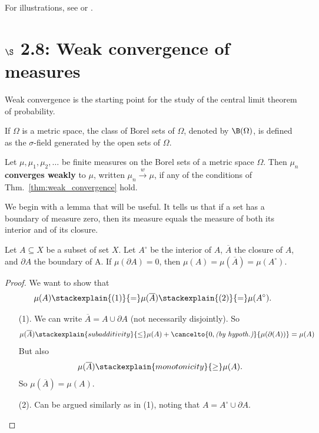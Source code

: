 \documentclass{article} %
\newcommand{\weakConvergence}{\stackrel{w}{\to}}
\newcommand{\interior}[1]{{#1}^\circ}
\begin{document}
For illustrations, see \cite[Fig.~2.7.1, pp.117]{ash2000probability} or \cite[Fig 1.1, pp.4]{matthews2017scalable}.

\section{$\S$ 2.8: Weak convergence of measures}

Weak convergence is the starting point for the study of the central limit theorem of probability.

If $\Omega$ is a metric space, the class of Borel sets of $\Omega$, denoted by $\B(\Omega)$, is defined as the $\sigma$-field generated by the open sets of $\Omega$.

\begin{definition}
Let $\mu, \mu_1, \mu_2, \hdots$ be finite measures on the Borel sets of a metric space $\Omega$.  Then $\mu_n$ \textbf{converges weakly} to $\mu$, written $\mu_n \weakConvergence \mu$,  if any of the conditions of Thm.~\ref{thm:weak_convergence} hold.
\label{def:weak_convergence}
\end{definition}

We begin with a lemma that will be useful.  It tells us that if a set has a boundary of measure zero, then its measure equals the measure of both its interior and of its closure.
\begin{lemma}
Let $A \subseteq X$ be a subset of set $X$. Let $\interior{A}$ be the interior of $A$, $\overline{A}$ the closure of $A$, and $\partial A$ the boundary of A.  If $\mu(\partial A) =0$, then $\mu(A) = \mu(\overline{A}) = \mu(\interior{A})$.
\label{lemma:null_boundaries_mean_that_a_set_has_the_same_measure_as_its_interior_and_its_closure}
\end{lemma}

\begin{proof}
We want to show that 
\[\mu(A) \stackexplain{(1)}{=} \mu(\overline{A}) \stackexplain{(2)}{=} \mu(\interior{A}).\] 
\begin{itemize}
\item [(1).] We can write $\overline{A} = A \cup \partial A$ (not necessarily disjointly). 	 So
\[ \mu(\overline{A}) \stackexplain{subadditivity}{\leq} \mu(A) + \cancelto{0, \textit{(by hypoth.)}}{\mu(\partial(A))} = \mu(A)\]
But also 
\[ \mu(\overline{A}) \stackexplain{monotonicity}{\geq} \mu(A).  \]
So $\mu(\overline{A}) = \mu(A)$. 
\item [(2).] Can be argued similarly as in (1), noting that $A = \interior{A} \cup \partial A$.
\end{itemize}

\end{proof}
\end{document}
